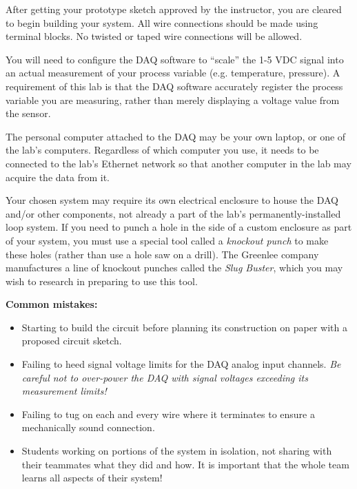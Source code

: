 \documentclass[12pt,a4paper]{article}
\begin{document}
\begin{itemize}
After getting your prototype sketch approved by the instructor, you are cleared to begin building your system.  All wire connections should be made using terminal blocks.  No twisted or taped wire connections will be allowed.

\vskip 10pt

You will need to configure the DAQ software to ``scale'' the 1-5 VDC signal into an actual measurement of your process variable (e.g. temperature, pressure).  A requirement of this lab is that the DAQ software accurately register the process variable you are measuring, rather than merely displaying a voltage value from the sensor.

\vskip 10pt

The personal computer attached to the DAQ may be your own laptop, or one of the lab's computers.  Regardless of which computer you use, it needs to be connected to the lab's Ethernet network so that another computer in the lab may acquire the data from it.

\vskip 10pt

Your chosen system may require its own electrical enclosure to house the DAQ and/or other components, not already a part of the lab's permanently-installed loop system.  If you need to punch a hole in the side of a custom enclosure as part of your system, you must use a special tool called a {\it knockout punch} to make these holes (rather than use a hole saw on a drill).  The Greenlee company manufactures a line of knockout punches called the {\it Slug Buster}, which you may wish to research in preparing to use this tool.

\vskip 10pt

{\bf Common mistakes:}

\begin{itemize}
\item{} Starting to build the circuit before planning its construction on paper with a proposed circuit sketch.
\item{} Failing to heed signal voltage limits for the DAQ analog input channels.  {\it Be careful not to over-power the DAQ with signal voltages exceeding its measurement limits!}
\item{} Failing to tug on each and every wire where it terminates to ensure a mechanically sound connection.
\item{} Students working on portions of the system in isolation, not sharing with their teammates what they did and how.  It is important that the whole team learns all aspects of their system!
\end{itemize}


\end{itemize}
\end{document}
